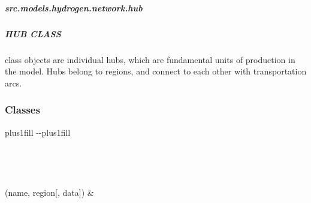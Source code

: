 \documentclass[letterpaper,10pt,english]{sphinxmanual}
\begin{document}
\sphinxstepscope


\subparagraph{src.models.hydrogen.network.hub}
\label{\detokenize{src.models.hydrogen.network.hub:module-src.models.hydrogen.network.hub}}\label{\detokenize{src.models.hydrogen.network.hub:src-models-hydrogen-network-hub}}\label{\detokenize{src.models.hydrogen.network.hub::doc}}

\subparagraph{HUB CLASS}
\label{\detokenize{src.models.hydrogen.network.hub:hub-class}}
\sphinxAtStartPar
class objects are individual hubs, which are fundamental units of production in the model. Hubs
belong to regions, and connect to each other with transportation arcs.
\subsubsection*{Classes}


\begin{savenotes}
\sphinxatlongtablestart
\sphinxthistablewithglobalstyle
\sphinxthistablewithnovlinesstyle
\makeatletter
  \LTleft \@totalleftmargin plus1fill
  \LTright\dimexpr\columnwidth-\@totalleftmargin-\linewidth\relax plus1fill
\makeatother
\begin{longtable}{}
\sphinxtoprule
\endfirsthead

\\
\sphinxtoprule
\endhead

\sphinxbottomrule
{}\\
\endfoot

\endlastfoot
\sphinxtableatstartofbodyhook

\sphinxAtStartPar
{\hyperref[\detokenize{src.models.hydrogen.network.hub:src.models.hydrogen.network.hub.Hub}]{}}(name, region{[}, data{]})
&
\sphinxAtStartPar

\\
\sphinxbottomrule
\end{longtable}
\sphinxtableafterendhook
\sphinxatlongtableend
\end{savenotes}
\end{document}
